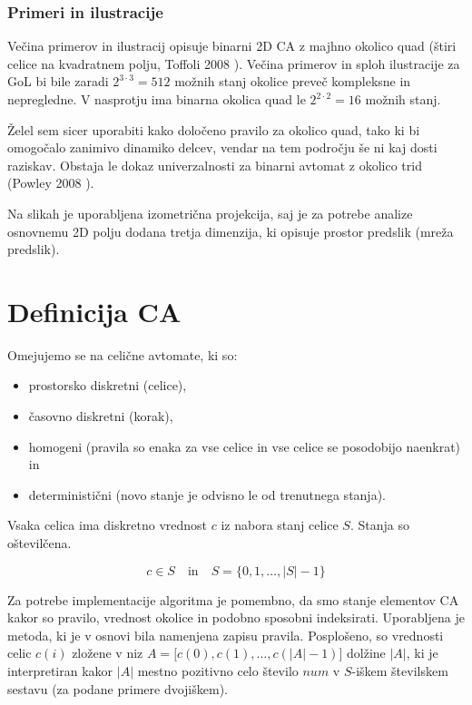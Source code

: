 \documentclass[12pt,a4paper,openany,twoside]{book}
\begin{document}
\subsection{Primeri in ilustracije}

Večina primerov in ilustracij opisuje binarni 2D CA z majhno okolico quad
(štiri celice na kvadratnem polju, Toffoli 2008 \cite{Toffoli2008}).
Večina primerov in sploh ilustracije za GoL bi bile zaradi
\(2^{3 \cdot 3}=512\) možnih stanj okolice preveč kompleksne in nepregledne.
V nasprotju ima binarna okolica quad le \(2^{2 \cdot 2}=16\) možnih stanj.

Želel sem sicer uporabiti kako določeno pravilo za okolico quad,
tako ki bi omogočalo zanimivo dinamiko delcev, vendar na tem področju še ni kaj dosti raziskav.
Obstaja le dokaz univerzalnosti za binarni avtomat z okolico trid (Powley 2008 \cite{Powley2008}).

Na slikah je uporabljena izometrična projekcija,
saj je za potrebe analize osnovnemu 2D polju dodana tretja dimenzija,
ki opisuje prostor predslik (mreža predslik).




\chapter{Definicija CA}

Omejujemo se na celične avtomate, ki so:
\begin{itemize}
\item prostorsko diskretni (celice),
\item časovno diskretni (korak),
\item homogeni (pravila so enaka za vse celice in vse celice se posodobijo naenkrat) in
\item deterministični (novo stanje je odvisno le od trenutnega stanja).
\end{itemize}

Vsaka celica ima diskretno vrednost \(c\) iz nabora stanj celice \(S\).
Stanja so oštevilčena.

\begin{equation}
c \in S
\quad \textrm{in} \quad
S = \{ 0, 1, \ldots, |S|-1 \}
\end{equation}

Za potrebe implementacije algoritma je pomembno,
da smo stanje elementov CA kakor so pravilo, vrednost okolice in podobno
sposobni indeksirati.
Uporabljena je metoda, ki je v osnovi bila namenjena zapisu pravila.
Posplošeno, so vrednosti celic \(c(i)\) zložene v niz \(A=[c(0),c(1), \ldots, c(|A|-1)\)] dolžine \(|A|\),
ki je interpretiran kakor \(|A|\) mestno pozitivno celo število \(num\) v
\(S\)-iškem številskem sestavu (za podane primere dvojiškem).
\end{document}
